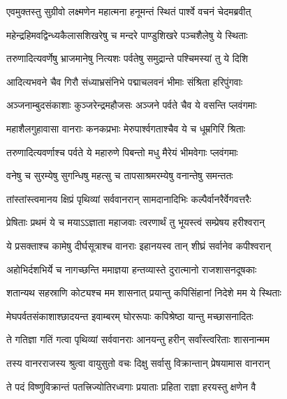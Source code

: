 
\twolineshloka
{एवमुक्तस्तु सुग्रीवो लक्ष्मणेन महात्मना}
{हनूमन्तं स्थितं पार्श्वे वचनं चेदमब्रवीत्} %

\twolineshloka
{महेन्द्रहिमवद्विन्ध्यकैलासशिखरेषु च}
{मन्दरे पाण्डुशिखरे पञ्चशैलेषु ये स्थिताः} %

\twolineshloka
{तरुणादित्यवर्णेषु भ्राजमानेषु नित्यशः}
{पर्वतेषु समुद्रान्ते पश्चिमस्यां तु ये दिशि} %

\twolineshloka
{आदित्यभवने चैव गिरौ संध्याभ्रसंनिभे}
{पद्माचलवनं भीमाः संश्रिता हरिपुंगवाः} %

\twolineshloka
{अञ्जनाम्बुदसंकाशाः कुञ्जरेन्द्रमहौजसः}
{अञ्जने पर्वते चैव ये वसन्ति प्लवंगमाः} %

\twolineshloka
{महाशैलगुहावासा वानराः कनकप्रभाः}
{मेरुपार्श्वगताश्चैव ये च धूम्रगिरिं श्रिताः} %

\twolineshloka
{तरुणादित्यवर्णाश्च पर्वते ये महारुणे}
{पिबन्तो मधु मैरेयं भीमवेगाः प्लवंगमाः} %

\twolineshloka
{वनेषु च सुरम्येषु सुगन्धिषु महत्सु च}
{तापसाश्रमरम्येषु वनान्तेषु समन्ततः} %

\twolineshloka
{तांस्तांस्त्वमानय क्षिप्रं पृथिव्यां सर्ववानरान्}
{सामदानादिभिः कल्पैर्वानरैर्वेगवत्तरैः} %

\twolineshloka
{प्रेषिताः प्रथमं ये च मयाऽऽज्ञाता महाजवाः}
{त्वरणार्थं तु भूयस्त्वं सम्प्रेषय हरीश्वरान्} %

\twolineshloka
{ये प्रसक्ताश्च कामेषु दीर्घसूत्राश्च वानराः}
{इहानयस्व तान् शीघ्रं सर्वानेव कपीश्वरान्} %

\twolineshloka
{अहोभिर्दशभिर्ये च नागच्छन्ति ममाज्ञया}
{हन्तव्यास्ते दुरात्मानो राजशासनदूषकाः} %

\twolineshloka
{शतान्यथ सहस्राणि कोट्यश्च मम शासनात्}
{प्रयान्तु कपिसिंहानां निदेशे मम ये स्थिताः} %

\twolineshloka
{मेघपर्वतसंकाशाश्छादयन्त इवाम्बरम्}
{घोररूपाः कपिश्रेष्ठा यान्तु मच्छासनादितः} %

\twolineshloka
{ते गतिज्ञा गतिं गत्वा पृथिव्यां सर्ववानराः}
{आनयन्तु हरीन् सर्वांस्त्वरिताः शासनान्मम} %

\twolineshloka
{तस्य वानरराजस्य श्रुत्वा वायुसुतो वचः}
{दिक्षु सर्वासु विक्रान्तान् प्रेषयामास वानरान्} %

\twolineshloka
{ते पदं विष्णुविक्रान्तं पतत्त्रिज्योतिरध्वगाः}
{प्रयाताः प्रहिता राज्ञा हरयस्तु क्षणेन वै} %

